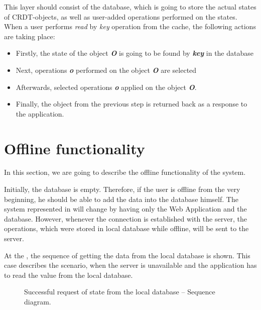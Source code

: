 This layer should consist of the database, which is going to store the actual states of CRDT-objects, as well as user-added operations performed on the states.
When a user performs \textit{read} by \textit{key} operation from the cache, the following actions are taking place:

\begin{itemize}
\item Firstly, the state of the object \textit{\textbf{O}} is going to be found by \textit{\textbf{key}} in the database
\item Next, operations \textit{\textbf{o}} performed on the object \textit{\textbf{O}} are selected
\item Afterwards, selected operations \textit{\textbf{o}} applied on the object \textit{\textbf{O}}.
\item Finally, the object from the previous step is returned back as a response to the application.
\end{itemize} 

\section{Offline functionality}

In this section, we are going to describe the offline functionality of the system.

Initially, the database is empty. Therefore, if the user is offline from the very beginning, he should be able to add the data into the database himself. 
The system represented in  will change by having only the Web Application and the database. However, whenever the connection is established with the server, the operations, which were stored in local database while offline, will be sent to the server. 

At the , the sequence of getting the data from the local database is shown. This case describes the scenario, when the server is unavailable and the application has to read the value from the local database. 

\begin{figure}[!htb]
    \begin{center}
    \def\svgwidth{\columnwidth}
    
    \caption {Successful request of state from the local database -- Sequence diagram.}
    \label{fig:design6}
\end{center}
\end{figure}


